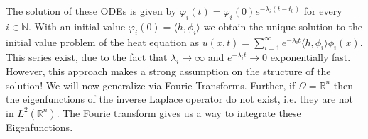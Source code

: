 \documentclass[A4,12pt,twoside]{book}
\begin{document}
The solution of these ODEs is given by $\varphi_i (t) = \varphi_i (0) e^{- \lambda_i (t -t_0)}$ for every $i \in \mathbb{N}$. With an initial value $\varphi_i(0)=\langle h,\phi_i\rangle$ we obtain the unique solution to the initial value problem of the heat equation as $u(x,t) = \sum_{i=1}^\infty e^{-\lambda_i t} \langle h,\phi_i\rangle \phi_i (x)$. This series exist, due to the fact that $\lambda_i \to \infty$ and $e^{- \lambda_i t} \to 0$ exponentially fast. However, this approach makes a strong assumption on the structure of the solution! We will now generalize via Fourie Transforms. Further, if $\Omega = \mathbb{R}^n$ then the eigenfunctions of the inverse Laplace operator do not exist, i.e. they are not in $L^2(\mathbb{R}^n)$. The Fourie transform gives us a way to integrate these Eigenfunctions.
\vspace{1cm}
\end{document}
